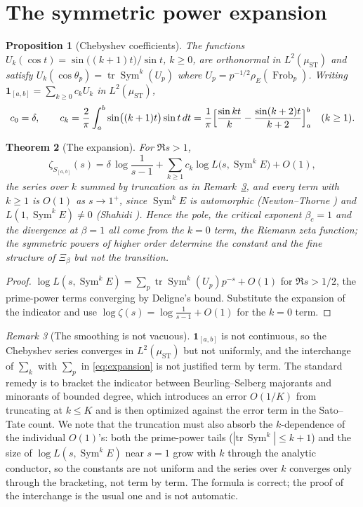 \documentclass[11pt]{amsart}
\numberwithin{equation}{section}
\newtheorem{theorem}{Theorem}[section]
\newtheorem{proposition}[theorem]{Proposition}
\theoremstyle{definition}
\theoremstyle{remark}
\newtheorem{remark}[theorem]{Remark}
\newcommand{\Sym}{\operatorname{Sym}}
\newcommand{\Tr}{\operatorname{tr}}
\newcommand{\Frob}{\operatorname{Frob}}
\newcommand{\ST}{\mathrm{ST}}
\begin{document}
\section{The symmetric power expansion}

\begin{proposition}[Chebyshev coefficients]\label{prop:cheb}
The functions $U_k(\cos t)=\sin\bigl((k+1)t\bigr)/\sin t$, $k\ge0$, are orthonormal in
$L^2(\mu_\ST)$ and satisfy $U_k(\cos\theta_p)=\Tr\Sym^k(U_p)$ where
$U_p=p^{-1/2}\rho_E(\Frob_p)$. Writing
$\mathbf 1_{[a,b]}=\sum_{k\ge0}c_kU_k$ in $L^2(\mu_\ST)$,
\[
c_0=\delta,\qquad
c_k=\frac{2}{\pi}\int_a^b\sin\bigl((k+1)t\bigr)\sin t\,dt
=\frac1\pi\Bigl[\frac{\sin kt}{k}-\frac{\sin(k+2)t}{k+2}\Bigr]_a^b\quad(k\ge1).
\]
\end{proposition}

\begin{theorem}[The expansion]\label{thm:expansion}
For $\Re s>1$,
\begin{equation}\label{eq:expansion}
\zeta_{S_{[a,b]}}(s)=\delta\,\log\frac{1}{s-1}+\sum_{k\ge1}c_k\log L\bigl(s,\Sym^kE\bigr)+O(1),
\end{equation}
the series over $k$ summed by truncation as in Remark~\ref{rem:smoothing}, and every term
with $k\ge1$ is $O(1)$ as $s\to1^+$, since $\Sym^kE$ is automorphic
(Newton--Thorne \cite{NT}) and $L(1,\Sym^kE)\ne0$ (Shahidi \cite{Shahidi}). Hence the pole, the critical exponent
$\beta_c=1$ and the divergence at $\beta=1$ all come from the $k=0$ term, the Riemann zeta
function; the symmetric powers of higher order determine the constant and the fine structure
of $\Xi_\beta$ but not the transition.
\end{theorem}

\begin{proof}
$\log L(s,\Sym^kE)=\sum_p\Tr\Sym^k(U_p)p^{-s}+O(1)$ for $\Re s>1/2$, the prime-power terms
converging by Deligne's bound. Substitute the expansion of the indicator and use
$\log\zeta(s)=\log\frac{1}{s-1}+O(1)$ for the $k=0$ term.
\end{proof}

\begin{remark}[The smoothing is not vacuous]\label{rem:smoothing}
$\mathbf 1_{[a,b]}$ is not continuous, so the Chebyshev series converges in $L^2(\mu_\ST)$
but not uniformly, and the interchange of $\sum_k$ with $\sum_p$ in \eqref{eq:expansion} is
not justified term by term. The standard remedy is to bracket the indicator between
Beurling--Selberg majorants and minorants of bounded degree, which introduces an error
$O(1/K)$ from truncating at $k\le K$ and is then optimized against the error term in the
Sato--Tate count. We note that the truncation must also absorb the $k$-dependence of the
individual $O(1)$'s: both the prime-power tails ($|\mathrm{tr}\,\Sym^k|\le k+1$) and the
size of $\log L(s,\Sym^kE)$ near $s=1$ grow with $k$ through the analytic conductor, so the
constants are not uniform and the series over $k$ converges only through the bracketing, not
term by term. The formula is correct; the proof of the interchange is the usual one and
is not automatic.
\end{remark}
\end{document}
